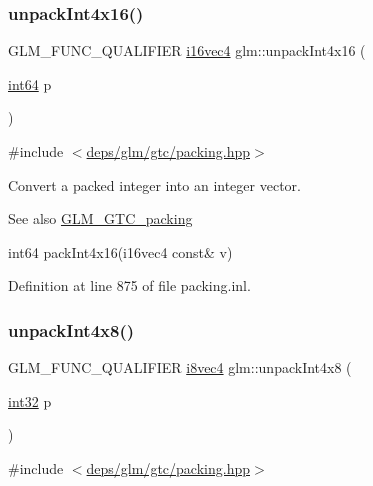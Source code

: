 \subsubsection{\texorpdfstring{unpack\+Int4x16()}{unpackInt4x16()}}
{\footnotesize\ttfamily G\+L\+M\+\_\+\+F\+U\+N\+C\+\_\+\+Q\+U\+A\+L\+I\+F\+I\+ER \hyperlink{group__gtc__type__precision_ga99a249a4cc129cb527c48d3afd38b666}{i16vec4} glm\+::unpack\+Int4x16 (\begin{DoxyParamCaption}\item[{\hyperlink{group__gtc__type__precision_ga435d75819cce297cc5fa21bd84ef89a5}{int64}}]{p }\end{DoxyParamCaption})}



{\ttfamily \#include $<$\hyperlink{gtc_2packing_8hpp}{deps/glm/gtc/packing.\+hpp}$>$}

Convert a packed integer into an integer vector.

\begin{DoxySeeAlso}{See also}
\hyperlink{group__gtc__packing}{G\+L\+M\+\_\+\+G\+T\+C\+\_\+packing} 

int64 pack\+Int4x16(i16vec4 const\& v) 
\end{DoxySeeAlso}


Definition at line 875 of file packing.\+inl.

\mbox{\label{group__gtc__packing_gaeed27076c5d26f4cca0d06637d3e878c}} 
\subsubsection{\texorpdfstring{unpack\+Int4x8()}{unpackInt4x8()}}
{\footnotesize\ttfamily G\+L\+M\+\_\+\+F\+U\+N\+C\+\_\+\+Q\+U\+A\+L\+I\+F\+I\+ER \hyperlink{group__gtc__type__precision_gaaad99cfb998ddcb74e9c33d0149fdd0e}{i8vec4} glm\+::unpack\+Int4x8 (\begin{DoxyParamCaption}\item[{\hyperlink{group__gtc__type__precision_ga632d8b25f6b61659f39ea4321fab92a4}{int32}}]{p }\end{DoxyParamCaption})}



{\ttfamily \#include $<$\hyperlink{gtc_2packing_8hpp}{deps/glm/gtc/packing.\+hpp}$>$}

